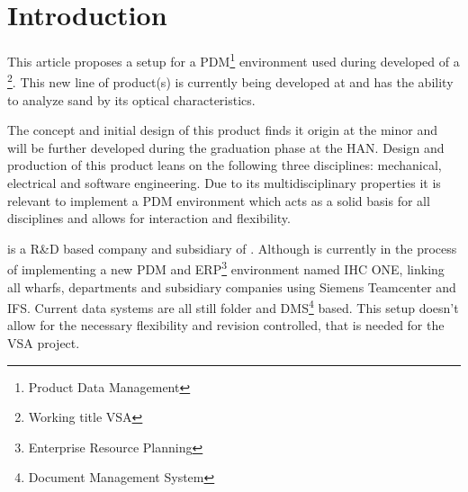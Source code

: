 \documentclass[fleqn,10pt]{SelfArx} %
\affiliation{\textsuperscript{1}\textit{Department of Engineering, HAN University of Applied Sciences, Arnhem, the Netherlands}} %
\affiliation{*\textbf{Corresponding author}: \href{mailto:spijker.jelle@gmail.com}{spijker.jelle@gmail.com}} %
\begin{document}
\flushbottom %

\maketitle %

\tableofcontents %

\thispagestyle{empty} %


\section*{Introduction} %

This article proposes a setup for a PDM\footnote{Product Data Management} environment used during developed of a \vsa\footnote{Working title VSA}. This new line of product(s) is currently being developed at \mti and has the ability to analyze sand by its optical characteristics. 

The concept and initial design of this product finds it origin at the minor \evd and will be further developed during the graduation phase \wtb at the HAN. Design and production of this product leans on the following three disciplines: mechanical, electrical and software engineering. Due to its multidisciplinary properties it is relevant to implement a PDM environment which acts as a solid basis for all disciplines and allows for interaction and flexibility.

\mti is a R\&D based company and subsidiary of \ihc. Although \ihc is currently in the process of implementing a new PDM and ERP\footnote{Enterprise Resource Planning} environment named IHC ONE, linking all wharfs, departments and subsidiary companies using Siemens Teamcenter and IFS. Current data systems are all still folder and DMS\footnote{Document Management System} based. This setup doesn't allow for the necessary flexibility and revision controlled, that is needed for the VSA project.
\end{document}
